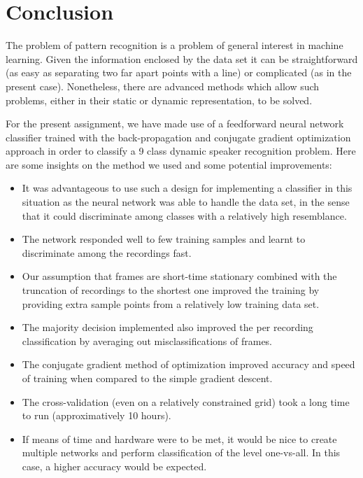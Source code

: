 \documentclass[a4paper,10pt]{article}
\begin{document}
\section{Conclusion}
The problem of pattern recognition is a problem of general interest in machine learning. Given the information enclosed by the data set it can be straightforward (as easy as separating two far apart points with a line) or complicated (as in the present case). Nonetheless, there are advanced methods which allow such problems, either in their static or dynamic representation, to be solved. 

For the present assignment, we have made use of a feedforward neural network classifier trained with the back-propagation and conjugate gradient optimization approach in order to classify a 9 class dynamic speaker recognition problem.  Here are some insights on the method we used and some potential improvements:
\begin{itemize}
\item It was advantageous to use such a design for implementing a classifier in this situation as the neural network was able to handle the data set, in the sense that it could discriminate among classes with a relatively high resemblance.

\item The network responded well to few training samples and learnt to discriminate among the recordings fast.

\item Our assumption that frames are short-time stationary combined with the truncation of recordings to the shortest one improved the training by providing extra sample points from a relatively low training data set.

\item The majority decision implemented also improved the per recording classification by averaging out misclassifications of frames.

\item The conjugate gradient method of optimization improved accuracy and speed of training when compared to the simple gradient descent.

\item The cross-validation (even on a relatively constrained grid) took a long time to run (approximatively 10 hours).

\item If means of time and hardware were to be met, it would be nice to create multiple networks and perform classification of the level one-vs-all. In this case, a higher accuracy would be expected.
\end{itemize}
\end{document}
